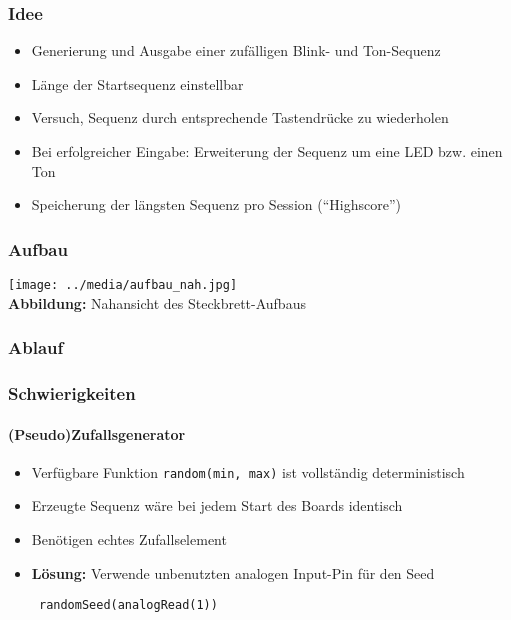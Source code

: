 \documentclass[xcolor=dvipsnames,10pt]{beamer}
\begin{document}
\begin{frame}\frametitle{Idee}
	\begin{itemize} \itemsep3ex
		\item Generierung und Ausgabe einer zufälligen Blink- und Ton-Sequenz 
		\item Länge der Startsequenz einstellbar
		\item Versuch, Sequenz durch entsprechende Tastendrücke zu wiederholen
		\item Bei erfolgreicher Eingabe: Erweiterung der Sequenz um eine LED bzw. einen Ton
		\item Speicherung der längsten Sequenz pro Session ("`Highscore"')
	\end{itemize}

\end{frame}





\begin{frame}\frametitle{Aufbau}
	\centering
	\texttt{[image: ../media/aufbau\_nah.jpg]} \\
	{\small \textbf{Abbildung:} Nahansicht des Steckbrett-Aufbaus}
\end{frame}





\begin{frame}\frametitle{Ablauf}
\end{frame}




\begin{frame}[fragile]\frametitle{Schwierigkeiten}\framesubtitle{(Pseudo)Zufallsgenerator}
	\begin{itemize}\itemsep3ex
		\item Verfügbare Funktion \verb|random(min, max)| ist vollständig deterministisch
		\item Erzeugte Sequenz wäre bei jedem Start des Boards identisch
		\item Benötigen echtes Zufallselement
		\item \textbf{Lösung:} Verwende unbenutzten analogen Input-Pin für den Seed
		\begin{verbatim} randomSeed(analogRead(1)) \end{verbatim}

	
	\end{itemize}

\end{frame}
\end{document}
